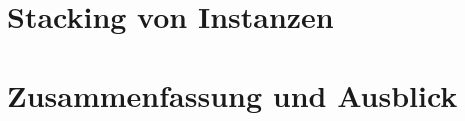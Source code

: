 \documentclass[ngerman, a4paper, 12pt, twoside]{article}
\numberwithin{equation}{section} %
\begin{document}
\section{Stacking von Instanzen}
	
\clearpage

\section{Zusammenfassung und Ausblick}
	
\clearpage

\newpage
{}
\renewcommand\refname{Quellen} %
{ %
}

\newpage
{}
{}
\listoffigures

\newpage
{}
{}
\listoftables
\end{document}
